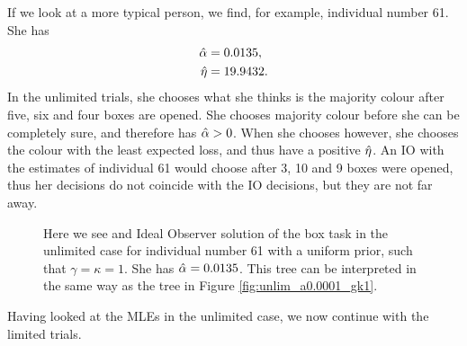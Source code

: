 If we look at a more typical person, we find, for example, individual number 61. She has
\begin{equation}
\label{mles_unilim_person61}
    \begin{aligned}
        \hat{\alpha} &= 0.0135,\\
        \hat{\eta} &= 19.9432.
    \end{aligned}
\end{equation}
In the unlimited trials, she chooses what she thinks is the majority colour after five, six and four boxes are opened. She chooses majority colour before she can be completely sure, and therefore has $\hat{\alpha}>0$. When she chooses however, she chooses the colour with the least expected loss, and thus have a positive $\hat{\eta}$. An IO with the estimates of individual 61 would choose after 3, 10 and 9 boxes were opened, thus her decisions do not coincide with the IO decisions, but they are not far away.  
\begin{figure}
    \centering
    \scalebox{0.7}{}
    \caption[Ideal Observer solution individual 61, unlimited. $\gamma=\kappa=1$]{Here we see and Ideal Observer solution of the box task in the unlimited case for individual number 61 with a uniform prior, such that $\gamma=\kappa=1$. She has $\hat{\alpha}=0.0135$. This tree can be interpreted in the same way as the tree in Figure \ref{fig:unlim_a0.0001_gk1}.}
    \label{fig:IO_sol_individual61}
\end{figure}

Having looked at the MLEs in the unlimited case, we now continue with the limited trials. 


